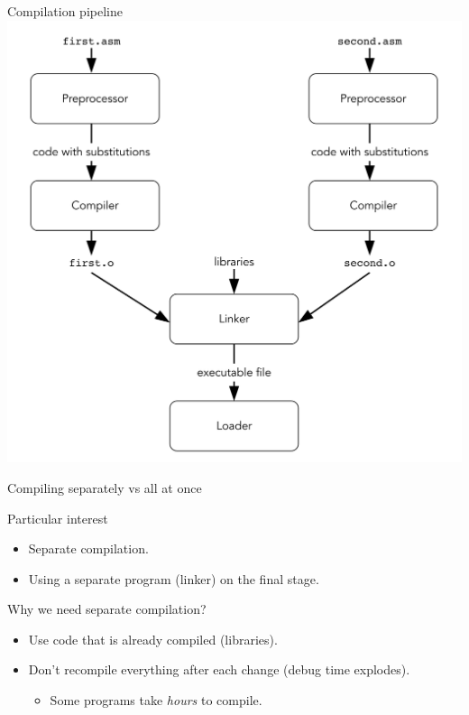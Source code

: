 \documentclass[xcolor={usenames,dvipsnames}]{beamer}
\begin{document}
\begin{frame}{Compilation pipeline}
    \includegraphics[height=\textheight]{images/compilation.png} 
\end{frame}


\begin{frame}{Compiling separately vs all at once}

\end{frame}

\begin{frame}{Particular interest}

\begin{itemize}
    \item  Separate compilation.
    \item  Using a separate program (linker) on the final stage.
\end{itemize}
\end{frame}

\begin{frame}{Why we need separate compilation?}
\begin{itemize}
    \item  Use code that is already compiled (libraries).
    \item  Don't recompile everything after each change (debug time explodes).

    \begin{itemize}
        \item  Some programs take \emph{hours} to compile.
    \end{itemize}
    
\end{itemize}
\end{frame}


\begin{frame}

\end{frame}
% 
\end{document}
